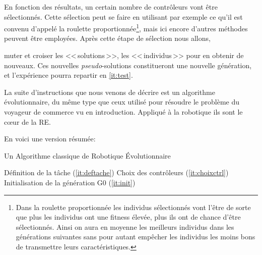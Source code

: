 \begin{inparaenum}[(\itshape 1\upshape)]
 \item \label{it:select} En fonction des résultats, un certain nombre de contrôleurs vont être sélectionnés. Cette sélection peut se faire en utilisant par exemple ce qu'il est convenu d'appelé la roulette proportionnée\footnote{Dans la roulette proportionnée les individus sélectionnés vont l'être de sorte que plus les individus ont une fitness élevée, plus ils ont de chance d'être sélectionnés. Ainsi on aura en moyenne les meilleurs individus dans les générations suivantes sans pour autant empêcher les individus les moins bons de transmettre leurs caractéristiques.}, mais ici encore d'autres méthodes peuvent être employées. Après cette étape de sélection nous allons, \item \label{it:reproduction} muter et croiser les <<\,solutions\,>>, les <<\,individus\,>> pour en obtenir de nouveaux. Ces nouvelles \emph{pseudo}-solutions constitueront une nouvelle génération, et l'expérience pourra repartir en \ref{it:test}.
\end{inparaenum}

La suite d'instructions que nous venons de décrire est un algorithme évolutionnaire, du même type que ceux utilisé pour résoudre le problème du voyageur de commerce vu en introduction. Appliqué à la robotique ils sont le cœur de la RE. 

En voici une version résumée:

\begin{algorithm}
	\dontprintsemicolon 
	\caption{Un Algorithme classique de Robotique \'Evolutionnaire}\label{alg:RE}
		 Définition de la tâche (\ref{it:deftache})\;
		 Choix des contrôleurs (\ref{it:choixctrl})\;
		 Initialisation de la génération G0 (\ref{it:init})\;
\end{algorithm}

